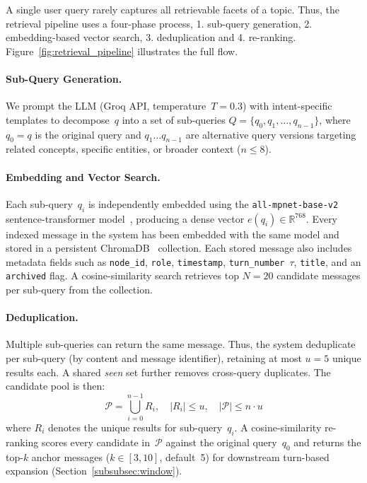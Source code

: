 \documentclass[pdflatex,sn-mathphys-num]{sn-jnl}%
\theoremstyle{thmstyleone}%
\theoremstyle{thmstyletwo}%
\theoremstyle{thmstylethree}%
\begin{document}
A single user query rarely captures all retrievable facets of a topic. Thus, the retrieval pipeline uses a four-phase process, 1. sub-query generation, 2. embedding-based vector search, 3. deduplication and 4. re-ranking. Figure~\ref{fig:retrieval_pipeline} illustrates the full flow.

\paragraph{Sub-Query Generation.}
We prompt the LLM (Groq API, temperature~$T{=}0.3$) with intent-specific templates to decompose~$q$ into a set of sub-queries $Q = \{q_0, q_1, \dots, q_{n-1}\}$, where $q_0 = q$ is the original query and $q_1 \dots q_{n-1}$ are alternative query versions targeting related concepts, specific entities, or broader context ($n \leq 8$).






\paragraph{Embedding and Vector Search.}
Each sub-query~$q_i$ is independently embedded using the \texttt{all-mpnet-base-v2} sentence-transformer model~\cite{reimers2019sentencebert}, producing a dense vector $e(q_i) \in \mathbb{R}^{768}$. Every indexed message in the system has been embedded with the same model and stored in a persistent ChromaDB~\cite{chromadb} collection. Each stored message also includes metadata fields such as \texttt{node\_id}, \texttt{role}, \texttt{timestamp}, \texttt{turn\_number}~$\tau$, \texttt{title}, and an \texttt{archived} flag. A cosine-similarity search retrieves top $N{=}20$ candidate messages per sub-query from the collection.

\paragraph{Deduplication.}
Multiple sub-queries can return the same message. Thus, the system  deduplicate per sub-query (by content and message identifier), retaining at most $u = 5$ unique results each. A shared \emph{seen} set further removes cross-query duplicates. The candidate pool is then:
\begin{equation}
\mathcal{P} = \bigcup_{i=0}^{n-1} R_i, \quad |R_i| \leq u, \quad |\mathcal{P}| \leq n \cdot u
\label{eq:candidate_pool}
\end{equation}
where $R_i$ denotes the unique results for sub-query~$q_i$. A cosine-similarity re-ranking scores every candidate in~$\mathcal{P}$ against the original query~$q_0$ and returns the top-$k$ anchor messages ($k \in [3, 10]$, default~5) for downstream turn-based expansion (Section~\ref{subsubsec:window}).
\end{document}
